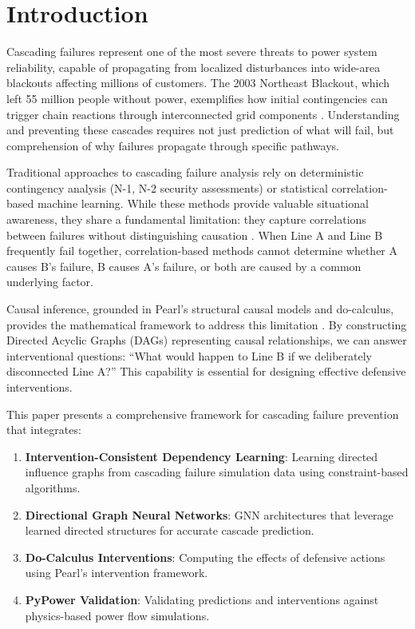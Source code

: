 \documentclass[journal,12pt,onecolumn]{IEEEtran}
\begin{document}
\section{Introduction}
\label{sec:introduction}

Cascading failures represent one of the most severe threats to power system reliability, capable of propagating from localized disturbances into wide-area blackouts affecting millions of customers. The 2003 Northeast Blackout, which left 55 million people without power, exemplifies how initial contingencies can trigger chain reactions through interconnected grid components \cite{ref1}. Understanding and preventing these cascades requires not just prediction of what will fail, but comprehension of why failures propagate through specific pathways.

Traditional approaches to cascading failure analysis rely on deterministic contingency analysis (N-1, N-2 security assessments) or statistical correlation-based machine learning. While these methods provide valuable situational awareness, they share a fundamental limitation: they capture correlations between failures without distinguishing causation \cite{ref2}. When Line A and Line B frequently fail together, correlation-based methods cannot determine whether A causes B's failure, B causes A's failure, or both are caused by a common underlying factor.

Causal inference, grounded in Pearl's structural causal models and do-calculus, provides the mathematical framework to address this limitation \cite{ref3}. By constructing Directed Acyclic Graphs (DAGs) representing causal relationships, we can answer interventional questions: ``What would happen to Line B if we deliberately disconnected Line A?'' This capability is essential for designing effective defensive interventions.

This paper presents a comprehensive framework for cascading failure prevention that integrates:

\begin{enumerate}
    \item \textbf{Intervention-Consistent Dependency Learning}: Learning directed influence graphs from cascading failure simulation data using constraint-based algorithms.
    
    \item \textbf{Directional Graph Neural Networks}: GNN architectures that leverage learned directed structures for accurate cascade prediction.
    
    \item \textbf{Do-Calculus Interventions}: Computing the effects of defensive actions using Pearl's intervention framework.
    
    \item \textbf{PyPower Validation}: Validating predictions and interventions against physics-based power flow simulations.
\end{enumerate}
\end{document}
